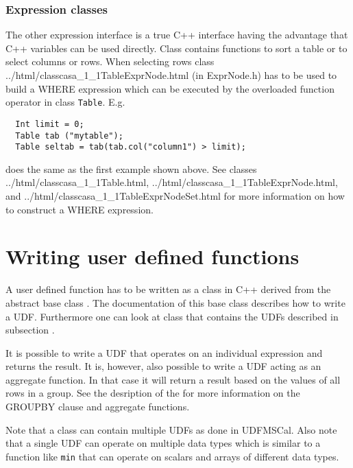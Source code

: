 \subsubsection{Expression classes}
    The other expression interface is a true C++ interface having the
    advantage that C++ variables can be used directly. Class
    contains functions to sort a table or to select columns or rows.
    When selecting rows class 
    {../html/classcasa_1_1TableExprNode.html} (in ExprNode.h)
    has to be used to
    build a WHERE expression which can be executed by the overloaded
    function operator in class \texttt{Table}. E.g.
\begin{verbatim}
  Int limit = 0;
  Table tab ("mytable");
  Table seltab = tab(tab.col("column1") > limit);
\end{verbatim}
    does the same as the first example shown above.
    See classes 
    {../html/classcasa_1_1Table.html},
    {../html/classcasa_1_1TableExprNode.html}, and
    {../html/classcasa_1_1TableExprNodeSet.html} for more
    information on how to construct a WHERE expression.

\section{\label{TAQL:UDFWRITE}Writing user defined functions}
A user defined function has to be written as a class in C++
derived from the abstract base class
.
The documentation of this base class describes how to write a
UDF. Furthermore one can look at class
that contains the UDFs described in subsection
.

It is possible to write a UDF that operates on an individual
expression and returns the result. It is, however, also possible to
write a UDF acting as an aggregate function. In that case it will
return a result based on the values of all rows in a group.
See the desription of the  for
more information on the GROUPBY clause and aggregate functions.

Note that a class can contain multiple UDFs as done in UDFMSCal.
Also note that a single UDF can operate on multiple data types which
is similar to a function like \texttt{min} that can operate on scalars
and arrays of different data types.

